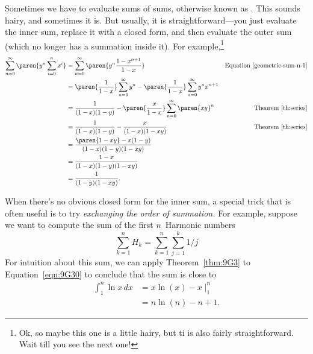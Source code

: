 Sometimes we have to evaluate sums of sums, otherwise known as
.  This sounds hairy, and sometimes it is.
But usually, it is straightforward---you just evaluate the inner sum,
replace it with a closed form, and then evaluate the outer sum (which
no longer has a summation inside it).  For example,\footnote{Ok, so
  maybe this one is a little hairy, but ti is also fairly
  straightforward.  Wait till you see the next one!}  
\begin{align*}
\sum_{n=0}^{\infty} \paren{y^n \sum_{i=0}^n x^i}
 & = \sum_{n=0}^{\infty} \paren{y^n \frac{1-x^{n+1}}{1-x}}
     & \text{Equation~\eqref{geometric-sum-n-1}}\\
%
 & = \paren{\frac{1}{1-x}} \sum_{n=0}^{\infty} y^n
     - \paren{\frac{1}{1-x}} \sum_{n=0}^{\infty} y^nx^{n+1} \\
%
 & = \frac{1}{(1-x)(1-y)}
    - \paren{\frac{x}{1 - x}} \sum_{n=0}^{\infty} \paren{xy}^n
      & \text{Theorem~\ref{th:series}}\\
%
 & = \frac{1}{(1-x)(1-y)} - \frac{x}{(1-x)(1-xy)}
      & \text{Theorem~\ref{th:series}}\\
%
  & = \frac{\paren{1-xy} - x(1-y)}{(1-x)(1-y)(1-xy)}\\
%
  & = \frac{1-x}{(1-x)(1-y)(1-xy)}\\
%
  & = \frac{1}{(1-y)(1-xy)}.
\end{align*}


When there's no obvious closed form for the inner sum, a special trick
that is often useful is to try \emph{exchanging the order of
  summation.}  For example, suppose we want to compute the sum of the
first $n$~Harmonic numbers
\[
    \sum_{k=1}^n H_k = \sum_{k=1}^n \sum_{j=1}^k 1/j
\]
For intuition about this sum, we can apply Theorem~\ref{thm:9G3} to
Equation~\ref{eqn:9G30} to conclude that the sum is close to
\begin{align*}
\int_{1}^n \ln x \, dx
    &=  x \ln(x) - x \; \Bigr|_1^n \\
    &= n \ln(n) - n + 1.
\end{align*}

